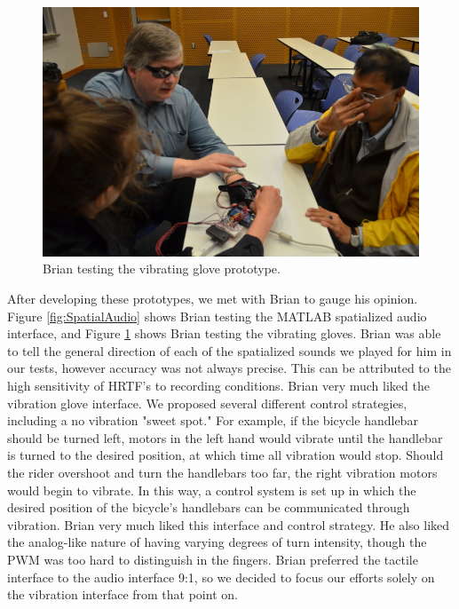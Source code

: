 \documentclass[aps,twocolumn,secnumarabic,balancelastpage,amsmath,amssymb,nofootinbib]{revtex4-1}
\begin{document}
\begin{figure}
\includegraphics[scale=0.22]{brian_testing_gloves.jpg}
\caption{Brian testing the vibrating glove prototype.}
\label{fig:BrianTestingGloves}
\end{figure}

After developing these prototypes, we met with Brian to gauge his opinion. Figure \ref{fig:SpatialAudio} shows Brian testing the MATLAB spatialized audio interface, and Figure \ref{fig:BrianTestingGloves} shows Brian testing the vibrating gloves. Brian was able to tell the general direction of each of the spatialized sounds we played for him in our tests, however accuracy was not always precise. This can be attributed to the high sensitivity of HRTF's to recording conditions. Brian very much liked the vibration glove interface. We proposed several different control strategies, including a no vibration "sweet spot." For example, if the bicycle handlebar should be turned left, motors in the left hand would vibrate until the handlebar is turned to the desired position, at which time all vibration would stop. Should the rider overshoot and turn the handlebars too far, the right vibration motors would begin to vibrate. In this way, a control system is set up in which the desired position of the bicycle's handlebars can be communicated through vibration. Brian very much liked this interface and control strategy. He also liked the analog-like nature of having varying degrees of turn intensity, though the PWM was too hard to distinguish in the fingers. Brian preferred the tactile interface to the audio interface 9:1, so we decided to focus our efforts solely on the vibration interface from that point on.
\end{document}
